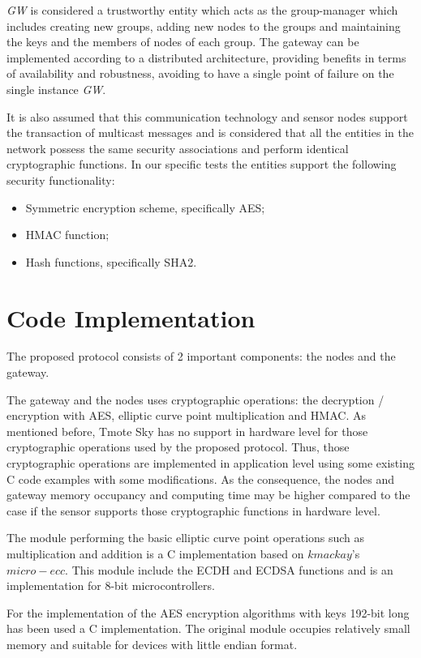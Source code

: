 \textit{GW} is considered a trustworthy entity which acts as  the group-manager which includes creating new groups, adding new nodes to the groups and maintaining the keys and the members of nodes of each group.
The gateway can be implemented according to a distributed architecture, providing benefits in terms of availability and robustness, avoiding to have a single point of failure on the single instance \textit{GW}.

It is also assumed that this communication technology and sensor nodes support  the transaction of multicast messages and is considered that all the entities in the network possess the same security associations and perform identical cryptographic functions. In our specific tests the entities support the following security functionality:
\begin{itemize}
\item Symmetric encryption scheme, specifically \acs{AES};
\item \acs{HMAC} function;
\item Hash functions, specifically SHA2.
\end{itemize}

\section{Code Implementation}
The proposed protocol consists of 2 important components: the nodes and the gateway.

The gateway and the nodes uses cryptographic operations: the decryption / encryption with AES, elliptic curve point multiplication and HMAC. As mentioned before, Tmote Sky has no support in hardware level for those cryptographic operations used by the proposed protocol. Thus, those cryptographic operations are implemented in application level using some existing C code examples with some modifications. As the consequence, the nodes and gateway memory occupancy and computing time may be higher compared to the case if the sensor supports those cryptographic functions in hardware level.

The module performing the basic elliptic curve point operations such as multiplication and addition is a C implementation based on $kmackay$'s $micro-ecc$.
This module include the ECDH and ECDSA functions and is an implementation for 8-bit microcontrollers.%

For the implementation of the AES encryption algorithms with keys 192-bit long has been used a C implementation. %
The original module occupies relatively small memory and suitable for devices with little endian format.


